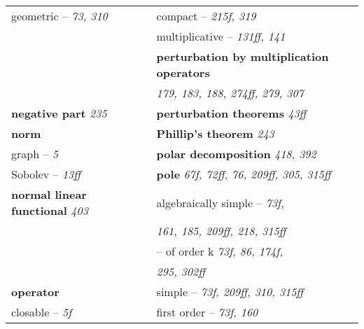 \begin{longtable}{p{}p{}}
\quad geometric -- \textit{73, 310} & \quad compact -- \textit{215f, 319} \\
& \quad multiplicative -- \textit{131ff, 141} \\
& \textbf{perturbation by multiplication operators} \\
& \quad \textit{179, 183, 188, 274ff, 279, 307} \\
\textbf{negative part} \textit{235} & \textbf{perturbation theorems} \textit{43ff} \\
\textbf{norm} & \textbf{Phillip's theorem} \textit{243} \\
\quad graph -- \textit{5} & \textbf{polar decomposition} \textit{418, 392} \\
\quad Sobolev -- \textit{13ff} & \textbf{pole} \textit{67f, 72ff, 76, 209ff, 305, 315ff} \\
\textbf{normal linear functional} \textit{403} & \quad algebraically simple -- \textit{73f,} \\
& \quad\quad \textit{161, 185, 209ff, 218, 315ff} \\
& \quad -- of order k \textit{73f, 86, 174f,} \\
& \quad\quad \textit{295, 302ff} \\
\textbf{operator} & \quad simple -- \textit{73f, 209ff, 310, 315ff} \\
\quad closable -- \textit{5f} & \quad first order -- \textit{73f, 160} \\


\end{longtable}
